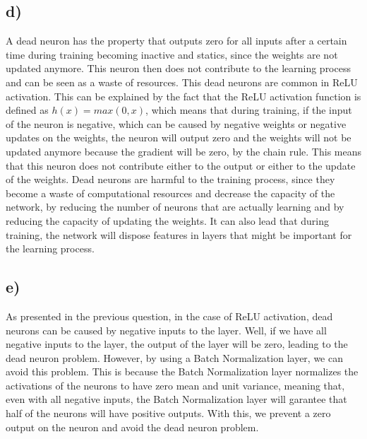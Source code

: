 \documentclass{article}
\begin{document}
\subsection*{d)}

A dead neuron has the property that outputs zero for all inputs after a certain time during training
becoming inactive and statics, since the weights are not updated anymore. This neuron then does not contribute
to the learning process and can be seen as a waste of resources. This dead neurons are common in ReLU activation. 
This can be explained by the fact that the ReLU activation function is defined as $h(x) = max(0, x)$, which means that
during training, if the input of the neuron is negative, which can be caused by negative weights or
negative updates on the weights, the neuron will output zero and the weights will not be updated anymore because
the gradient will be zero, by the chain rule. This means that this neuron does not contribute either to the output
or either to the update of the weights.
Dead neurons are harmful to the training process, since they become a waste of computational resources and decrease
the capacity of the network, by reducing the number of neurons that are actually learning and by reducing the capacity
of updating the weights. It can also lead that during training, the network will dispose features in layers
that might be important for the learning process.

\subsection*{e)}

As presented in the previous question, in the case of ReLU activation, dead neurons can be caused by negative inputs to
the layer. Well, if we have all negative inputs to the layer, the output of the layer will be zero, leading
to the dead neuron problem. However, by using a Batch Normalization layer, we can avoid this problem. This is because
the Batch Normalization layer normalizes the activations of the neurons to have zero mean and unit variance, meaning
that, even with all negative inputs, the Batch Normalization layer will garantee that half of the neurons will have
positive outputs. With this, we prevent a zero output on the neuron and avoid the dead neuron problem.





 
\end{document}
